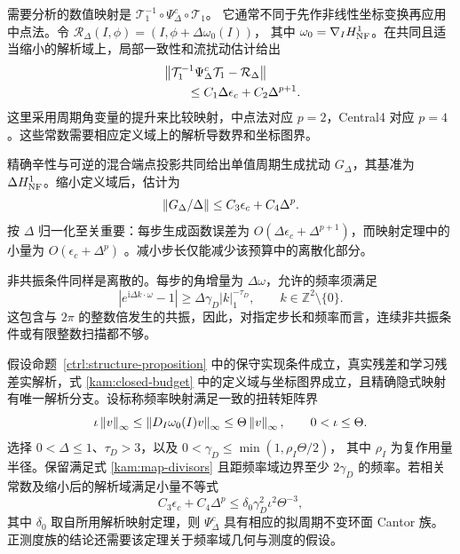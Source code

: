 需要分析的数值映射是
$\mathcal T_1^{-1}\circ\Psi_\Delta^c\circ\mathcal T_1$。
它通常不同于先作非线性坐标变换再应用中点法。令
$\mathcal R_\Delta(I,\phi)=(I,\phi+\Delta\omega_0(I))$，
其中 $\omega_0=\nabla_I H_{\rm NF}^{1}$。在共同且适当缩小的解析域上，局部一致性和流扰动估计给出
\begin{equation}\label{kam:map-closeness}
\begin{aligned}
 &\left\lVert\mathcal T_1^{-1}\Psi_\Delta^c\mathcal T_1
            -\mathcal R_\Delta\right\rVert\\
 &\qquad\le C_1\Delta\epsilon_c+C_2\Delta^{p+1}.
\end{aligned}
\end{equation}
这里采用周期角变量的提升来比较映射，中点法对应 $p=2$，Central4 对应 $p=4$。这些常数需要相应定义域上的解析导数界和坐标图界。

精确辛性与可逆的混合端点投影共同给出单值周期生成扰动 $G_\Delta$，其基准为 $\Delta H_{\rm NF}^{1}$。缩小定义域后，估计为
\begin{equation}\label{kam:map-generator-budget}
 \left\lVert G_\Delta/\Delta\right\rVert
       \le C_3\epsilon_c+C_4\Delta^p.
\end{equation}
按 $\Delta$ 归一化至关重要：每步生成函数误差为 $O(\Delta\epsilon_c+\Delta^{p+1})$，而映射定理中的小量为 $O(\epsilon_c+\Delta^p)$ \citep[Section~4]{shang}。减小步长仅能减少该预算中的离散化部分。

非共振条件同样是离散的。每步的角增量为 $\Delta\omega$，允许的频率须满足
\begin{equation}\label{kam:map-divisors}
 \left|e^{\mathrm i\Delta k\cdot\omega}-1\right|
       \ge\Delta\gamma_D|k|_1^{-\tau_D},
       \qquad k\in\mathbb Z^2\setminus\{0\}.
\end{equation}
这包含与 $2\pi$ 的整数倍发生的共振，因此，对指定步长和频率而言，连续非共振条件或有限整数扫描都不够。

\begin{proposition}[补偿后导管的条件性离散持续存在]
\label{kam:map-theorem}
假设命题~\ref{ctrl:structure-proposition} 中的保守实现条件成立，真实残差和学习残差实解析，式 \eqref{kam:closed-budget} 中的定义域与坐标图界成立，且精确隐式映射有唯一解析分支。设标称频率映射满足一致的扭转矩阵界
\[
 \iota\left\lVert v\right\rVert_\infty\le\left\lVert D_I\omega_0(I)v\right\rVert_\infty
                \le\Theta\left\lVert v\right\rVert_\infty,
 \qquad0<\iota\le\Theta.
\]
选择 $0<\Delta\le1$、$\tau_D>3$，以及
$0<\gamma_D\le\min(1,\rho_I\Theta/2)$，
其中 $\rho_I$ 为复作用量半径。保留满足式 \eqref{kam:map-divisors} 且距频率域边界至少 $2\gamma_D$ 的频率。若相关常数及缩小后的解析域满足小量不等式
\begin{equation}\label{kam:map-smallness}
 C_3\epsilon_c+C_4\Delta^p
       \le\delta_0\gamma_D^2\iota^2\Theta^{-3},
\end{equation}
其中 $\delta_0$ 取自所用解析映射定理，则 $\Psi_\Delta^c$ 具有相应的拟周期不变环面 Cantor 族。正测度族的结论还需要该定理关于频率域几何与测度的假设。
\end{proposition}

